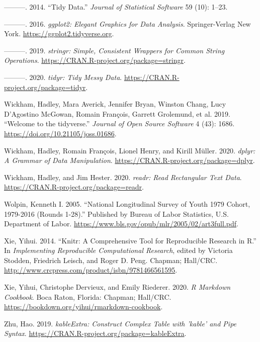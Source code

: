 \documentclass[12pt]{article}
\begin{document}
\leavevmode\hypertarget{ref-WickhamHadley2014TD}{}%
---------. 2014. ``Tidy Data.'' \emph{Journal of Statistical Software} 59 (10): 1--23.

\leavevmode\hypertarget{ref-ggplot2}{}%
---------. 2016. \emph{ggplot2: Elegant Graphics for Data Analysis}. Springer-Verlag New York. \url{https://ggplot2.tidyverse.org}.

\leavevmode\hypertarget{ref-stringr}{}%
---------. 2019. \emph{stringr: Simple, Consistent Wrappers for Common String Operations}. \url{https://CRAN.R-project.org/package=stringr}.

\leavevmode\hypertarget{ref-tidyr}{}%
---------. 2020. \emph{tidyr: Tidy Messy Data}. \url{https://CRAN.R-project.org/package=tidyr}.

\leavevmode\hypertarget{ref-tidyverse}{}%
Wickham, Hadley, Mara Averick, Jennifer Bryan, Winston Chang, Lucy D'Agostino McGowan, Romain François, Garrett Grolemund, et al. 2019. ``Welcome to the tidyverse.'' \emph{Journal of Open Source Software} 4 (43): 1686. \url{https://doi.org/10.21105/joss.01686}.

\leavevmode\hypertarget{ref-dplyr}{}%
Wickham, Hadley, Romain François, Lionel Henry, and Kirill Müller. 2020. \emph{dplyr: A Grammar of Data Manipulation}. \url{https://CRAN.R-project.org/package=dplyr}.

\leavevmode\hypertarget{ref-readr}{}%
Wickham, Hadley, and Jim Hester. 2020. \emph{readr: Read Rectangular Text Data}. \url{https://CRAN.R-project.org/package=readr}.

\leavevmode\hypertarget{ref-nlsy79edu}{}%
Wolpin, Kenneth I. 2005. ``National Longitudinal Survey of Youth 1979 Cohort, 1979-2016 (Rounds 1-28).'' Published by Bureau of Labor Statistics, U.S. Department of Labor. \url{https://www.bls.gov/opub/mlr/2005/02/art3full.pdf}.

\leavevmode\hypertarget{ref-knitr}{}%
Xie, Yihui. 2014. ``Knitr: A Comprehensive Tool for Reproducible Research in R.'' In \emph{Implementing Reproducible Computational Research}, edited by Victoria Stodden, Friedrich Leisch, and Roger D. Peng. Chapman; Hall/CRC. \url{http://www.crcpress.com/product/isbn/9781466561595}.

\leavevmode\hypertarget{ref-rmarkdown}{}%
Xie, Yihui, Christophe Dervieux, and Emily Riederer. 2020. \emph{R Markdown Cookbook}. Boca Raton, Florida: Chapman; Hall/CRC. \url{https://bookdown.org/yihui/rmarkdown-cookbook}.

\leavevmode\hypertarget{ref-kableExtra}{}%
Zhu, Hao. 2019. \emph{kableExtra: Construct Complex Table with 'kable' and Pipe Syntax}. \url{https://CRAN.R-project.org/package=kableExtra}.



\end{document}
